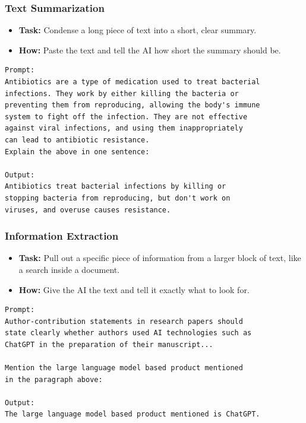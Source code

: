 \begin{frame}[fragile]\frametitle{Text Summarization}
\begin{itemize}
    \item \textbf{Task:} Condense a long piece of text into a short, clear summary.
    \item \textbf{How:} Paste the text and tell the AI how short the summary should be.
\end{itemize}
\begin{lstlisting}[language=HTML]
Prompt:
Antibiotics are a type of medication used to treat bacterial 
infections. They work by either killing the bacteria or 
preventing them from reproducing, allowing the body's immune 
system to fight off the infection. They are not effective 
against viral infections, and using them inappropriately 
can lead to antibiotic resistance.
Explain the above in one sentence:

Output:
Antibiotics treat bacterial infections by killing or 
stopping bacteria from reproducing, but don't work on 
viruses, and overuse causes resistance.
\end{lstlisting}
\end{frame}

\begin{frame}[fragile]\frametitle{Information Extraction}
\begin{itemize}
    \item \textbf{Task:} Pull out a specific piece of information from a larger block of text, like a search inside a document.
    \item \textbf{How:} Give the AI the text and tell it exactly what to look for.
\end{itemize}
\begin{lstlisting}[language=HTML]
Prompt:
Author-contribution statements in research papers should 
state clearly whether authors used AI technologies such as 
ChatGPT in the preparation of their manuscript...

Mention the large language model based product mentioned 
in the paragraph above:

Output:
The large language model based product mentioned is ChatGPT.
\end{lstlisting}
\end{frame}

